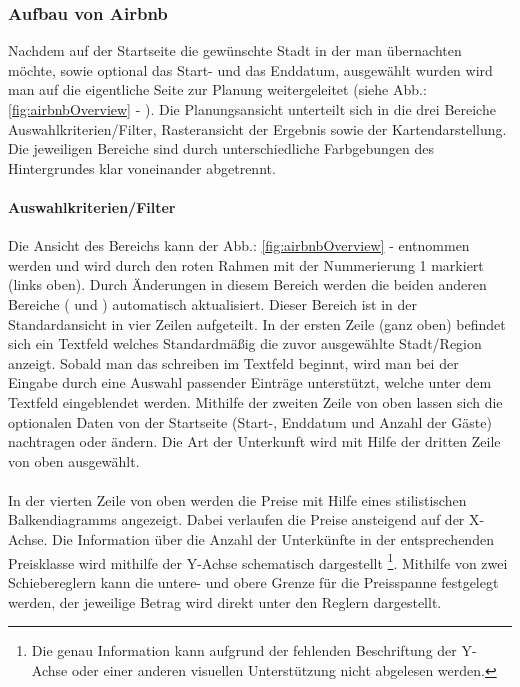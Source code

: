 \documentclass[../Bachelorarbeit.tex]{subfiles}
\begin{document}
\subsubsection*{Aufbau von Airbnb}
Nachdem auf der Startseite die gewünschte Stadt in der man übernachten möchte, sowie optional das Start- und das Enddatum, ausgewählt wurden wird man auf die eigentliche Seite zur Planung weitergeleitet (siehe Abb.: \ref{fig:airbnbOverview} - ).
Die Planungsansicht unterteilt sich in die drei Bereiche Auswahlkriterien/Filter, Rasteransicht der Ergebnis sowie der Kartendarstellung.
Die jeweiligen Bereiche sind durch unterschiedliche Farbgebungen des Hintergrundes klar voneinander abgetrennt.

\paragraph{Auswahlkriterien/Filter}
\label{airbnb:filter}
Die Ansicht des Bereichs kann der Abb.: \ref{fig:airbnbOverview} -  entnommen werden und wird durch den roten Rahmen mit der Nummerierung 1 markiert (links oben).
Durch Änderungen in diesem Bereich werden die beiden anderen Bereiche ( und ) automatisch aktualisiert. 
Dieser Bereich ist in der Standardansicht in vier Zeilen aufgeteilt. 
In der ersten Zeile (ganz oben) befindet sich ein Textfeld welches Standardmäßig die zuvor ausgewählte Stadt/Region anzeigt. 
Sobald man das schreiben im Textfeld beginnt, wird man bei der Eingabe durch eine Auswahl passender Einträge unterstützt, welche unter dem Textfeld eingeblendet werden.
Mithilfe der zweiten Zeile von oben lassen sich die optionalen Daten von der Startseite (Start-, Enddatum und Anzahl der Gäste) nachtragen oder ändern.
Die Art der Unterkunft wird mit Hilfe der dritten Zeile von oben ausgewählt.\\
\\
In der vierten Zeile von oben werden die Preise mit Hilfe eines stilistischen Balkendiagramms angezeigt. Dabei verlaufen die Preise ansteigend auf der X-Achse.
Die Information über die Anzahl der Unterkünfte in der entsprechenden Preisklasse wird mithilfe der Y-Achse schematisch dargestellt
\footnote{Die genau Information kann aufgrund der fehlenden Beschriftung der Y-Achse oder einer anderen visuellen Unterstützung nicht abgelesen werden.
	}.
Mithilfe von zwei Schiebereglern kann die untere- und obere Grenze für die Preisspanne festgelegt werden, der jeweilige Betrag wird direkt unter den Reglern dargestellt.
\end{document}
